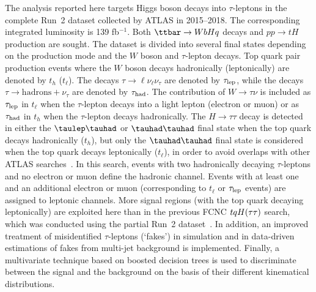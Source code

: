 
The analysis reported here targets Higgs boson decays into 
$\tau$-leptons in the complete Run~2 dataset collected by ATLAS in 2015--2018. The corresponding integrated luminosity is 139 fb$^{-1}$. Both $\ttbar \to WbHq$ decays and $pp \to tH$ production are sought. The dataset is divided into several final states depending on the production mode and
the  $W$ boson and $\tau$-lepton decays. Top quark pair production events where the $W$ boson decays hadronically (leptonically) are denoted by $t_h$ ($t_{\ell}$).
The decays $\tau \to \ell \nu_{\ell} \nu_{\tau}$ are denoted by $\tau_{\mathrm{lep}}$, while the decays $\tau \to \text{hadrons} + \nu_{\tau}$ are denoted by $\tau_\text{had}$.
The contribution of 
$W\rightarrow\tau\nu$ is included as $\tau_{\mathrm{lep}}$ in $t_{\ell}$ when the $\tau$-lepton decays into a light lepton (electron or muon) or as $\tau_\text{had}$ 
in $t_h$ when the $\tau$-lepton decays hadronically.
The $H\rightarrow \tau\tau$ decay is detected in
either the $\tlhad$ or $\thadhad$ final state when the top quark decays hadronically ($t_h$), but only the $\thadhad$ final state is considered
when the top quark decays leptonically ($t_{\ell}$), in order to avoid overlaps with
other ATLAS searches~\cite{Aaboud:2018pob}. 
In this search, events with two hadronically decaying $\tau$-leptons and no electron or muon define the hadronic channel. Events with at least one \tauhad and an additional electron or muon (corresponding to $t_{\ell}$ or $\tau_{\mathrm{lep}}$ events) are assigned to leptonic channels. More signal regions (with the top quark decaying leptonically) are exploited here than in the previous FCNC $tqH(\tau\tau)$ search, which was conducted using the partial Run~2 dataset~\cite{fcnc36}.
In addition, an improved treatment of misidentified $\tau$-leptons (`fakes') in simulation and in data-driven
estimations of fakes from multi-jet background is implemented.
Finally, a multivariate technique based on boosted decision trees is used to discriminate between the signal and the background on the basis of their different kinematical distributions. 

